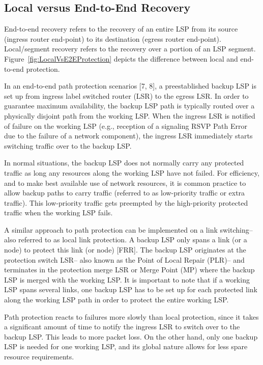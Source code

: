 \subsection{Local versus End-to-End Recovery}
End-to-end recovery refers to the recovery of an entire LSP from its
source (ingress router end-point) to its destination (egress router
end-point). Local/segment recovery refers to the recovery over a portion
of an LSP segment. Figure~\ref{fig:LocalVsE2EProtection} depicts
the difference between local and end-to-end protection.

In an end-to-end path protection scenarios {[}7, 8], a preestablished
backup LSP is set up from ingress label switched router (LSR) to the
egress LSR. In order to guarantee maximum availability, the backup
LSP path is typically routed over a physically disjoint path from
the working LSP. When the ingress LSR is notified of failure on the
working LSP (e.g., reception of a signaling RSVP Path Error due to
the failure of a network component), the ingress LSR immediately starts
switching traffic over to the backup LSP.

In normal situations, the backup LSP does not normally carry any protected
traffic as long any resources along the working LSP have not failed.
For efficiency, and to make best available use of network resources,
it is common practice to allow backup paths to carry traffic (referred
to as low-priority traffic or extra traffic). This low-priority traffic
gets preempted by the high-priority protected traffic when the working
LSP fails.

A similar approach to path protection can be implemented on a link
switching-- also referred to as local link protection. A backup LSP
only spans a link (or a node) to protect this link (or node) {[}FRR].
The backup LSP originates at the protection switch LSR-- also known
as the Point of Local Repair (PLR)-- and terminates in the protection
merge LSR or Merge Point (MP) where the backup LSP is merged with
the working LSP. It is important to note that if a working LSP spans
several links, one backup LSP has to be set up for each protected
link along the working LSP path in order to protect the entire working
LSP.

Path protection reacts to failures more slowly than local protection,
since it takes a significant amount of time to notify the ingress
LSR to switch over to the backup LSP. This leads to more packet loss.
On the other hand, only one backup LSP is needed for one working LSP,
and its global nature allows for less spare resource requirements.


